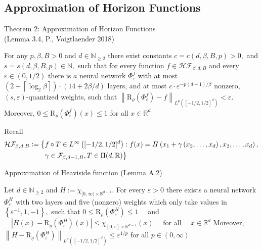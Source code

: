 \documentclass{if-beamer}
\newcommand{\defeq}{\vcentcolon=}
\begin{document}
\subsection{Approximation of Horizon Functions}
\begin{frame}{Theorem 2: Approximation of Horizon Functions \\ (Lemma 3.4, P., Voigtlaender 2018)}
    \begin{tcolorbox}
        For any $p, \beta, B>0$ and $d \in \mathbb{N}_{\geq 2}$ there exist constants $c=c(d, \beta, B, p)>0,$ and $s=s(d, \beta, B, p) \in \mathbb{N},$ such that for every function $f \in \mathcal{H} \mathcal{F}_{\beta, d, B}$ and every $\varepsilon \in(0,1 / 2)$ there is $a$ neural network $\Phi_{\varepsilon}^{f}$ with at most $\left(2+\left\lceil\log _{2} \beta\right\rceil\right) \cdot(14+2 \beta / d)$ layers, and at most $c \cdot \varepsilon^{-p(d-1) / \beta}$ nonzero,
        $(s, \varepsilon)$-quantized weights, such that $\left\|\mathrm{R}_{\varrho}\left(\Phi_{\varepsilon}^{f}\right)-f\right\|_{L^{p}\left([-1 / 2,1 / 2]^{d}\right)}<\varepsilon .$ Moreover, $0 \leq \mathrm{R}_{\varrho}\left(\Phi_{\varepsilon}^{f}\right)(x) \leq 1$ for all
        $x \in \mathbb{R}^{d}$    
    \end{tcolorbox}
    Recall 
    \small{
    \begin{align*}
        \mathcal{H} \mathcal{F}_{\beta, d, B}\defeq \big\{&f \circ T \in L^{\infty}\left([-1 / 2,1 / 2]^{d}\right): f(x)=H\left(x_{1}+\gamma\left(x_{2}, \ldots, x_{d}\right), x_{2}, \ldots, x_{d}\right),\\
        &\gamma \in \mathcal{F}_{\beta, d-1, B}, T \in \Pi(d, \mathbb{R})\big\}
    \end{align*}
    }
\end{frame}

\begin{frame}{Approximation of Heaviside function (Lemma A.2)}
    \begin{tcolorbox}
        Let $d \in \mathbb{N}_{\geq 2}$ and $H:=\chi_{[0, \infty) \times \mathbb{R}^{d-1}}$. For every $\varepsilon>0$ there exists a neural network $\Phi_{\varepsilon}^{H}$ with two layers and five (nonzero) weights which only take values in $\left\{\varepsilon^{-1}, 1,-1\right\},$ such that $0 \leq \mathrm{R}_{\varrho}\left(\Phi_{\varepsilon}^{H}\right) \leq 1 \quad$ and $\quad\left|H(x)-\mathrm{R}_{\varrho}\left(\Phi_{\varepsilon}^{H}\right)(x)\right| \leq \chi_{[0, \varepsilon] \times \mathbb{R}^{d-1}}(x) \quad$ for all $\quad x \in \mathbb{R}^{d}$ Moreover, $\left\|H-\mathrm{R}_{\varrho}\left(\Phi_{\varepsilon}^{H}\right)\right\|_{L^{p}\left([-1 / 2,1 / 2]^{d}\right)} \leq \varepsilon^{1 / p}$ for all $p \in(0, \infty)$
    \end{tcolorbox}
\end{frame}
\end{document}

